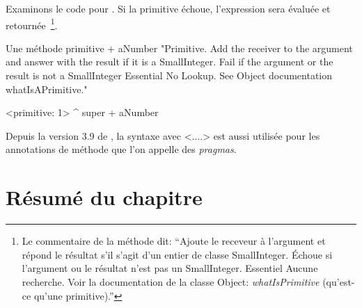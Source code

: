\documentclass[a4paper,10pt,twoside]{book}
\begin{document}
Examinons le code pour .
Si la primitive \'{e}choue, l'expression  sera
\'{e}valu\'{e}e et retourn\'{e}e~\footnote{Le commentaire de la
  m\'ethode dit: ``Ajoute le receveur \`a l'argument et r\'epond le
  r\'esultat s'il s'agit d'un entier de classe SmallInteger. \'Echoue
  si l'argument ou le r\'esultat n'est pas un
  SmallInteger. Essentiel Aucune recherche. Voir la documentation de
  la classe Object: \emph{whatIsPrimitive} (qu'est-ce qu'une primitive).''}.

\begin{method}[primitive]{Une m\'ethode primitive}
+ aNumber 
  "Primitive. Add the receiver to the argument and answer with the result
  if it is a SmallInteger. Fail if the argument or the result is not a
  SmallInteger  Essential  No Lookup. See Object documentation whatIsAPrimitive."

  <primitive: 1>
  ^ super + aNumber
\end{method}





Depuis la version 3.9 de \sq, la syntaxe avec <....> est aussi utilis\'{e}e pour les annotations de m\'{e}thode que l'on appelle des \emph{pragmas}.


\section{R\'{e}sum\'{e} du chapitre}
\end{document}
